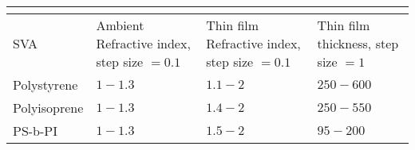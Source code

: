 \documentclass[MasterThesisMain.tex]{subfiles}
\begin{document}
\begin{table}
	\caption{}
\begin{tabular}{ |p{4cm}||p{3cm}|p{3cm}|p{3cm}| }
 \hline
 \multicolumn{4}{|c|}{} \\
 \hline
 SVA & Ambient Refractive index, step size $=0.1$ & Thin film Refractive index, step size $=0.1$ & Thin film thickness, step size $=1$\\
 \hline
Polystyrene & $1-1.3$ & $1.1-2$ & $250-600$ \\
Polyisoprene & $1-1.3$ & $1.4-2$ & $250-550$ \\
PS-b-PI & $1-1.3$ & $1.5-2$ & $95-200$ \\ 
\hline 
\end{tabular}
\label{}
\end{table}
\end{document}
